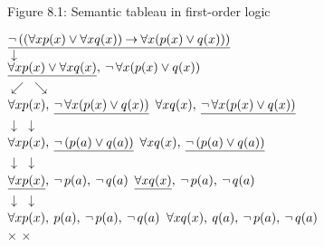 \documentclass[style=simple,size=12pt]{powerdot}
\begin{document}


\begin{wideslide}[bm=,toc=]{Figure 8.1: Semantic tableau in first-order
logic}
\begin{center}
$\underline{\mathop{\neg}\,((\forall xp(x) \vee \forall xq(x)) \mathbin{\rightarrow}
\forall x(p(x) \vee q(x)))}$ \\
$\downarrow$ \\
$\underline{\forall xp(x) \vee \forall xq(x)} ,\:
  \mathop{\neg} \forall x(p(x) \vee q(x))$ \\
$\swarrow$ \hspace{8em} $\searrow$ \\
$\forall xp(x),\: \underline{\mathop{\neg} \forall x(p(x) \vee q(x))}$
\hspace{2em}
$\forall xq(x),\: \underline{\mathop{\neg} \forall x(p(x) \vee q(x))}$ \\
$\downarrow$ \hspace{10em} $\downarrow$\\
$\forall xp(x),\: \underline{\mathop{\neg}\,(p(a) \vee q(a))}$
\hspace{2em}
$\forall xq(x),\: \underline{\mathop{\neg}\,(p(a) \vee q(a))}$ \\
$\downarrow$ \hspace{10em} $\downarrow$\\
$\underline{\forall xp(x)},\: \mathop{\neg} p(a),\: \mathop{\neg} q(a)$
\hspace{2em}
$\underline{\forall xq(x)},\: \mathop{\neg} p(a),\: \mathop{\neg} q(a)$ \\
$\downarrow$ \hspace{10em} $\downarrow$\\
$\forall xp(x),\: p(a),\: \mathop{\neg} p(a),\: \mathop{\neg} q(a)$ \hspace{2em}
$\forall xq(x),\: q(a),\: \mathop{\neg} p(a),\: \mathop{\neg} q(a)$ \\
$\times$ \hspace{10em} $\times$
\end{center}
\end{wideslide}
\end{document}
